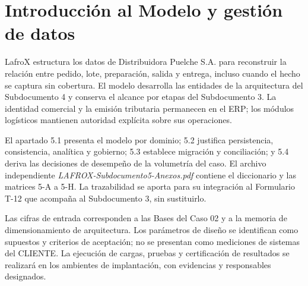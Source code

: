 \chapter{Introducción al Modelo y gestión de datos}
\label{cap:datos}
LafroX estructura los datos de Distribuidora Puelche S.A. para reconstruir la relación entre pedido, lote, preparación, salida y entrega, incluso cuando el hecho se captura sin cobertura. El modelo desarrolla las entidades de la arquitectura del Subdocumento 4 y conserva el alcance por etapas del Subdocumento 3. La identidad comercial y la emisión tributaria permanecen en el ERP; los módulos logísticos mantienen autoridad explícita sobre sus operaciones.

El apartado 5.1 presenta el modelo por dominio; 5.2 justifica persistencia, consistencia, analítica y gobierno; 5.3 establece migración y conciliación; y 5.4 deriva las decisiones de desempeño de la volumetría del caso. El archivo independiente \emph{LAFROX-Subdocumento5-Anexos.pdf} contiene el diccionario y las matrices 5-A a 5-H. La trazabilidad se aporta para su integración al Formulario T-12 que acompaña al Subdocumento 3, sin sustituirlo.

Las cifras de entrada corresponden a las Bases del Caso 02 y a la memoria de dimensionamiento de arquitectura. Los parámetros de diseño se identifican como supuestos y criterios de aceptación; no se presentan como mediciones de sistemas del CLIENTE. La ejecución de cargas, pruebas y certificación de resultados se realizará en los ambientes de implantación, con evidencias y responsables designados.
